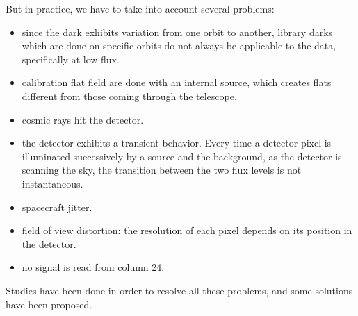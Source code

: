 But in practice, we have to take into account several problems:
\begin{itemize}
\item since the dark exhibits variation from one orbit to another, library 
darks which are done on specific orbits do not always be applicable to 
the data, specifically at low flux. 
\item calibration flat field are done with an internal source, which
creates flats different from those coming through the telescope.
\item cosmic rays hit the detector.
\item the detector exhibits a transient behavior. Every time a detector pixel is 
illuminated successively by a source and 
the background, as the detector is scanning the sky, the transition between the 
two flux levels is not instantaneous.  
\item spacecraft jitter.
\item field of view distortion: the resolution of each pixel depends on its 
position in the detector.
\item no signal is read from column 24.
\end{itemize}
Studies have been done in order to resolve all these problems, and 
some solutions have been proposed. 

